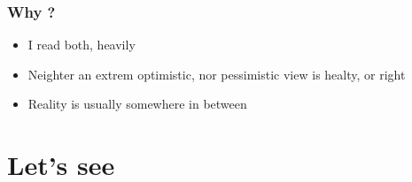 \documentclass[10pt,handout]{beamer}
\begin{document}
\begin{frame}
    \frametitle{Why ?}
    \begin{center}
      \begin{itemize}
        \item<1-> I read both, heavily
        \item<2-> Neighter an extrem optimistic, nor pessimistic view is healty, or right
        \item<3-> Reality is usually somewhere in between
    \end{itemize}
    \end{center}
\end{frame}


\section{}

\section{Let's see}
\newcommand{\qitem}[4] {
\begin{frame}
    \frametitle{futurology or collapse ?}
    \begin{itemize}
      \item<1-> #1
      \item<2-> #2
      \item<2-> \href{#3}{#3}
    \end{itemize}
\end{frame}

{ %
    \setbeamertemplate{navigation symbols}{}
    \begin{frame}[plain]
        \begin{tikzpicture}[remember picture,overlay]
            \node[at=(current page.center) t] {
                \texttt{[image: img/\#4]}
            };
        \end{tikzpicture}
     \end{frame}
}
}
\end{document}
